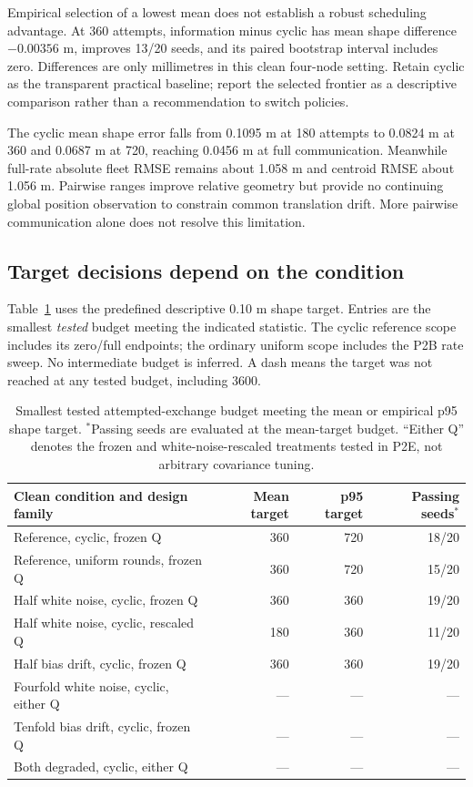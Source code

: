 Empirical selection of a lowest mean does not establish a robust scheduling advantage. At 360 attempts, information minus cyclic has mean shape difference \(-0.00356\) m, improves 13/20 seeds, and its paired bootstrap interval includes zero. Differences are only millimetres in this clean four-node setting. Retain cyclic as the transparent practical baseline; report the selected frontier as a descriptive comparison rather than a recommendation to switch policies.

The cyclic mean shape error falls from 0.1095 m at 180 attempts to 0.0824 m at 360 and 0.0687 m at 720, reaching 0.0456 m at full communication. Meanwhile full-rate absolute fleet RMSE remains about 1.058 m and centroid RMSE about 1.056 m. Pairwise ranges improve relative geometry but provide no continuing global position observation to constrain common translation drift. More pairwise communication alone does not resolve this limitation.

\subsection{Target decisions depend on the condition}
Table~\ref{tab:p2f_targets} uses the predefined descriptive 0.10 m shape target. Entries are the smallest \emph{tested} budget meeting the indicated statistic. The cyclic reference scope includes its zero/full endpoints; the ordinary uniform scope includes the P2B rate sweep. No intermediate budget is inferred. A dash means the target was not reached at any tested budget, including 3600.

\begin{table}[htbp]
\centering\small
\begin{tabular}{lrrr}
\toprule
Clean condition and design family & Mean target & p95 target & Passing seeds$^*$\\
\midrule
Reference, cyclic, frozen Q & 360 & 720 & 18/20\\
Reference, uniform rounds, frozen Q & 360 & 720 & 15/20\\
Half white noise, cyclic, frozen Q & 360 & 360 & 19/20\\
Half white noise, cyclic, rescaled Q & 180 & 360 & 11/20\\
Half bias drift, cyclic, frozen Q & 360 & 360 & 19/20\\
Fourfold white noise, cyclic, either Q & --- & --- & ---\\
Tenfold bias drift, cyclic, frozen Q & --- & --- & ---\\
Both degraded, cyclic, either Q & --- & --- & ---\\
\bottomrule
\end{tabular}
\caption{Smallest tested attempted-exchange budget meeting the mean or empirical p95 shape target. $^*$Passing seeds are evaluated at the mean-target budget. ``Either Q'' denotes the frozen and white-noise-rescaled treatments tested in P2E, not arbitrary covariance tuning.}
\label{tab:p2f_targets}
\end{table}

